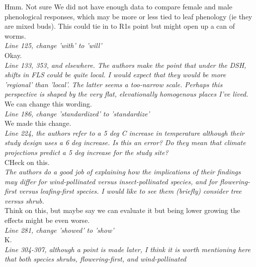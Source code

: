 \documentclass[11pt]{article}
\begin{document}
Hmm. Not sure We did not have enough data to compare female and male phenological responses, which may be more or less tied to leaf phenology (ie they are mixed buds). This could tie in to R1s point but might open up a can of worms.\\

\emph{Line 125, change 'with' to 'will'}\\

Okay.\\


\emph{Line 133, 353, and elsewhere. The authors make the point that under the DSH, shifts in FLS could be quite local. I would expect that they would be more 'regional' than 'local'. The latter seems a too-narrow scale. Perhaps this perspective is shaped by the very flat, elevationally homogenous places I've lived.}\\

We can change this wording.\\

\emph{Line 186, change 'standardized' to 'standardize'}\\

We made this change.\\


\emph{Line 224, the authors refer to a 5 deg C increase in temperature although their study design uses a 6 deg increase. Is this an error? Do they mean that climate projections predict a 5 deg increase for the study site?}\\

CHeck on this.\\

\emph{The authors do a good job of explaining how the implications of their findings may differ for wind-pollinated versus insect-pollinated species, and for flowering-first versus leafing-first species. I would like to see them (briefly) consider tree versus shrub.}\\

Think on this, but maybe say we can evaluate it but being lower growing the effects might be even worse.\\

\emph{Line 281, change 'showed' to 'show'}\\

K.\\

\emph{Line 304-307, although a point is made later, I think it is worth mentioning here that both species shrubs, flowering-first, and wind-pollinated}\\
\end{document}
